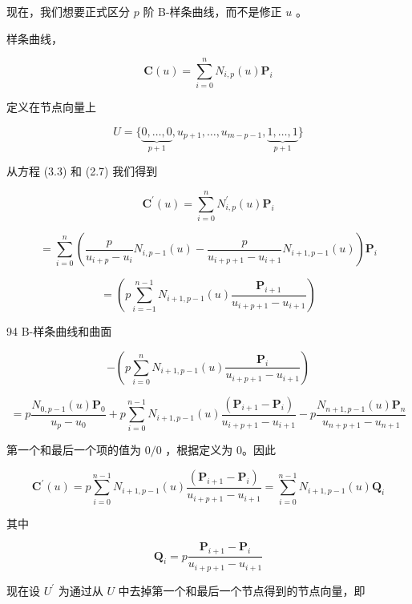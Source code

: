 \documentclass[../main.tex]{subfiles}
\begin{document}
现在，我们想要正式区分 \(p\) 阶 B-样条曲线，而不是修正 \(u\) 。

样条曲线，

\[
\mathbf{C}\left( u\right)  = \mathop{\sum }\limits_{{i = 0}}^{n}{N}_{i,p}\left( u\right) {\mathbf{P}}_{i}
\]

定义在节点向量上

\[
U = \{ \underset{p + 1}{\underbrace{0,\ldots ,0}},{u}_{p + 1},\ldots ,{u}_{m - p - 1},\underset{p + 1}{\underbrace{1,\ldots ,1}}\}
\]

从方程 (3.3) 和 (2.7) 我们得到

\[
{\mathbf{C}}^{\prime }\left( u\right)  = \mathop{\sum }\limits_{{i = 0}}^{n}{N}_{i,p}^{\prime }\left( u\right) {\mathbf{P}}_{i}
\]

\[
= \mathop{\sum }\limits_{{i = 0}}^{n}\left( {\frac{p}{{u}_{i + p} - {u}_{i}}{N}_{i,p - 1}\left( u\right)  - \frac{p}{{u}_{i + p + 1} - {u}_{i + 1}}{N}_{i + 1,p - 1}\left( u\right) }\right) {\mathbf{P}}_{i}
\]

\[
= \left( {p\mathop{\sum }\limits_{{i =  - 1}}^{{n - 1}}{N}_{i + 1,p - 1}\left( u\right) \frac{{\mathbf{P}}_{i + 1}}{{u}_{i + p + 1} - {u}_{i + 1}}}\right)
\]

94 B-样条曲线和曲面

\[
- \left( {p\mathop{\sum }\limits_{{i = 0}}^{n}{N}_{i + 1,p - 1}\left( u\right) \frac{{\mathbf{P}}_{i}}{{u}_{i + p + 1} - {u}_{i + 1}}}\right)
\]

\[
= p\frac{{N}_{0,p - 1}\left( u\right) {\mathbf{P}}_{0}}{{u}_{p} - {u}_{0}} + p\mathop{\sum }\limits_{{i = 0}}^{{n - 1}}{N}_{i + 1,p - 1}\left( u\right) \frac{\left( {\mathbf{P}}_{i + 1} - {\mathbf{P}}_{i}\right) }{{u}_{i + p + 1} - {u}_{i + 1}} - p\frac{{N}_{n + 1,p - 1}\left( u\right) {\mathbf{P}}_{n}}{{u}_{n + p + 1} - {u}_{n + 1}}
\]

第一个和最后一个项的值为 \(0/0\) ，根据定义为 0。因此

\[
{\mathbf{C}}^{\prime }\left( u\right)  = p\mathop{\sum }\limits_{{i = 0}}^{{n - 1}}{N}_{i + 1,p - 1}\left( u\right) \frac{\left( {\mathbf{P}}_{i + 1} - {\mathbf{P}}_{i}\right) }{{u}_{i + p + 1} - {u}_{i + 1}} = \mathop{\sum }\limits_{{i = 0}}^{{n - 1}}{N}_{i + 1,p - 1}\left( u\right) {\mathbf{Q}}_{i}
\]

其中

\[
{\mathbf{Q}}_{i} = p\frac{{\mathbf{P}}_{i + 1} - {\mathbf{P}}_{i}}{{u}_{i + p + 1} - {u}_{i + 1}} \tag{3.4}
\]

现在设 \({U}^{\prime }\) 为通过从 \(U\) 中去掉第一个和最后一个节点得到的节点向量，即
\end{document}
